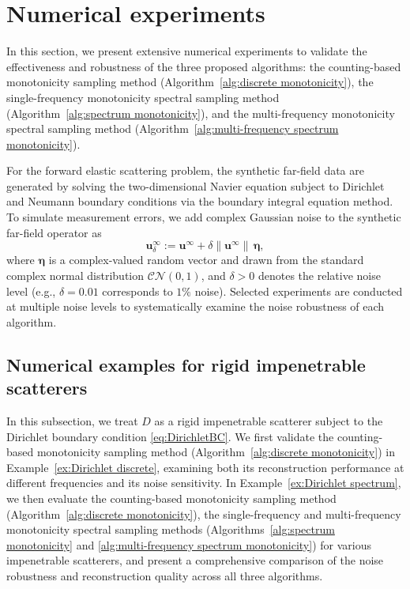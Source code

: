 \documentclass[11pt,reqno,twoside]{amsart}
\theoremstyle{definition}
\theoremstyle{remark}
\numberwithin{equation}{section}
\begin{document}
\section{ Numerical experiments}\label{sec:Numerical example}
In this section, we present extensive numerical experiments to validate the effectiveness and robustness of the three proposed algorithms: the counting-based monotonicity sampling method (Algorithm~\ref{alg:discrete monotonicity}), the single-frequency monotonicity spectral sampling method (Algorithm~\ref{alg:spectrum monotonicity}), and the multi-frequency monotonicity spectral sampling method (Algorithm~\ref{alg:multi-frequency spectrum monotonicity}).

For the forward elastic scattering problem, the synthetic far-field data are generated by solving the two-dimensional Navier equation subject to Dirichlet and Neumann boundary conditions via the boundary integral equation method. To simulate measurement errors, we add complex Gaussian noise to the synthetic far-field operator as
\begin{equation*}
\mathbf{u}^{\infty}_\delta := \mathbf{u}^\infty  + \delta\|\mathbf{u}^\infty\| \, \boldsymbol{\eta},
\label{eq:noisy_data}
\end{equation*}
where $\boldsymbol{\eta}$ is a complex-valued random vector and drawn from the standard complex normal distribution $\mathcal{CN}(0,1)$, and $\delta > 0$ denotes the relative noise level (e.g., $\delta = 0.01$ corresponds to $1\%$ noise). Selected experiments are conducted at multiple noise levels to systematically examine the noise robustness of each algorithm.


\subsection{Numerical examples for rigid impenetrable scatterers}
In this subsection, we treat $D$ as a rigid impenetrable scatterer subject to the Dirichlet boundary condition \eqref{eq:DirichletBC}. We first validate the counting-based monotonicity sampling method (Algorithm~\ref{alg:discrete monotonicity}) in Example~\ref{ex:Dirichlet discrete}, examining both its reconstruction performance at different frequencies and its noise sensitivity. In Example~\ref{ex:Dirichlet spectrum}, we then evaluate the counting-based monotonicity sampling method (Algorithm~\ref{alg:discrete monotonicity}), the single-frequency and multi-frequency monotonicity spectral sampling methods (Algorithms~\ref{alg:spectrum monotonicity} and \ref{alg:multi-frequency spectrum monotonicity}) for various impenetrable scatterers, and present a comprehensive comparison of the noise robustness and reconstruction quality across all three algorithms.
\end{document}
